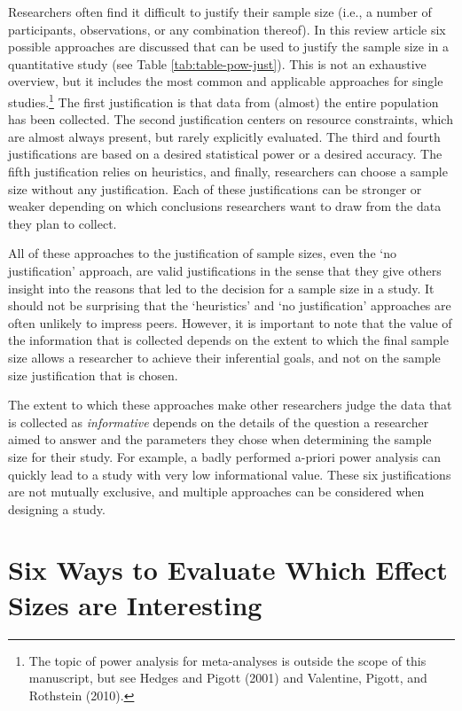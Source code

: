 \documentclass[
  english,
  ,jou, a4paper,floatsintext]{apa6}
\begin{document}
Researchers often find it difficult to justify their sample size (i.e., a number of participants, observations, or any combination thereof). In this review article six possible approaches are discussed that can be used to justify the sample size in a quantitative study (see Table \ref{tab:table-pow-just}). This is not an exhaustive overview, but it includes the most common and applicable approaches for single studies.\footnote{The topic of power analysis for meta-analyses is outside the scope of this manuscript, but see Hedges and Pigott (2001) and Valentine, Pigott, and Rothstein (2010).} The first justification is that data from (almost) the entire population has been collected. The second justification centers on resource constraints, which are almost always present, but rarely explicitly evaluated. The third and fourth justifications are based on a desired statistical power or a desired accuracy. The fifth justification relies on heuristics, and finally, researchers can choose a sample size without any justification. Each of these justifications can be stronger or weaker depending on which conclusions researchers want to draw from the data they plan to collect.

All of these approaches to the justification of sample sizes, even the `no justification' approach, are valid justifications in the sense that they give others insight into the reasons that led to the decision for a sample size in a study. It should not be surprising that the `heuristics' and `no justification' approaches are often unlikely to impress peers. However, it is important to note that the value of the information that is collected depends on the extent to which the final sample size allows a researcher to achieve their inferential goals, and not on the sample size justification that is chosen.

The extent to which these approaches make other researchers judge the data that is collected as \emph{informative} depends on the details of the question a researcher aimed to answer and the parameters they chose when determining the sample size for their study. For example, a badly performed a-priori power analysis can quickly lead to a study with very low informational value. These six justifications are not mutually exclusive, and multiple approaches can be considered when designing a study.

\hypertarget{six-ways-to-evaluate-which-effect-sizes-are-interesting}{%
\section{Six Ways to Evaluate Which Effect Sizes are Interesting}\label{six-ways-to-evaluate-which-effect-sizes-are-interesting}}
\end{document}
